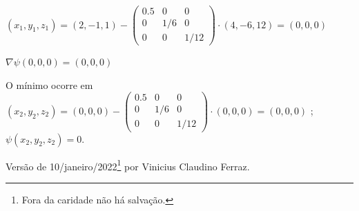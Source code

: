 \documentclass{rbfin}
\begin{document}
$(x_1, y_1, z_1) = (2, -1, 1) - \begin{pmatrix} 0.5 & 0 & 0 \\ 0 & 1/6 & 0 \\ 0 & 0 & 1/12 \end{pmatrix} \cdot (4, -6, 12) = (0 , 0, 0)$

$\nabla \psi(0, 0, 0) = (0, 0, 0)$

O mínimo ocorre em $(x_2, y_2, z_2) = (0, 0, 0) - \begin{pmatrix} 0.5 & 0 & 0 \\ 0 & 1/6 & 0 \\ 0 & 0 & 1/12 \end{pmatrix} \cdot (0, 0, 0) = (0, 0, 0)$ ; $\psi(x_2, y_2, z_2) = 0$.

\singlespacing

\vspace{6mm}

Versão de 10/janeiro/2022\footnote{Fora da caridade não há salvação.} por Vinicius Claudino Ferraz.
\end{document}
